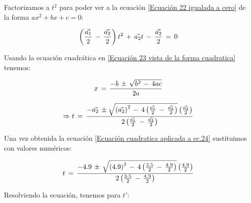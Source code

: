 \documentclass[letterpaper, 12pt]{article}
\begin{document}
\begin{enumerate}
\begin{enumerate}
            Factorizamos a $t^2$ para poder ver a la ecuación \ref{Ecuación 22 igualada a cero} de la forma $ax^{2} + bx + c = 0$:
            
            \begin{equation}
                \label{Ecuación 23 vista de la forma cuadratica}
                \left( \frac{\vec{a_{1}}}{2} \thinspace - \thinspace \frac{\vec{a_{2}}}{2} \right) t^{2} \thinspace + \thinspace \vec{a_{2}}t \thinspace - \thinspace \frac{\vec{a_{2}}}{2} \thinspace = \thinspace 0
            \end{equation}
            
            Usando la ecuación cuadrática en \ref{Ecuación 23 vista de la forma cuadratica} tenemos: 
            
            \begin{equation*}
                \label{Ecuación cuadratica}
                x \thinspace = \thinspace \frac{-b \thinspace \pm \thinspace \sqrt{b^{2} \thinspace - \thinspace 4ac}}{2a} 
            \end{equation*}
            
            \begin{equation}
                \label{Ecuación cuadratica aplicada a ec.24}
                \Rightarrow t \thinspace = \thinspace \frac{-\vec{a_{2}} \thinspace \pm \thinspace \\ \sqrt{\left(\vec{a_{2}}\right)^{2} \thinspace - \thinspace 4 \left( \frac{\vec{a_{1}}}{2} \thinspace - \thinspace \frac{\vec{a_{2}}}{2} \right)}\left(\frac{\vec{a_{2}}}{2}\right)}{2\left( \frac{\vec{a_{1}}}{2} \thinspace - \thinspace \frac{\vec{a_{2}}}{2} \right)}
            \end{equation}
            
            Una vez obtenida la ecuación \ref{Ecuación cuadratica aplicada a ec.24} sustituimos con valores numéricos: 
            
            \begin{equation}
                \label{Sustitución de la ecuación 25 con valores numéricos}
                t \thinspace = \thinspace \frac{-4.9 \thinspace \pm \thinspace \sqrt{\left(4.9\right)^{2} \thinspace - \thinspace 4 \left( \frac{3.5}{2} \thinspace - \thinspace \frac{4.9}{2} \right)}\left(\frac{4.9}{2}\right)}{2\left( \frac{3.5}{2} \thinspace - \thinspace \frac{4.9}{2} \right)} 
            \end{equation}
            
            Resolviendo la ecuación, tenemos para $t'$: 
            

\end{enumerate}
\end{enumerate}
\end{document}
